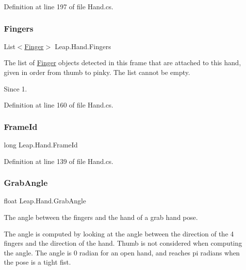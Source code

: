 Definition at line 197 of file Hand.\+cs.

\mbox{\label{class_leap_1_1_hand_ac9f68349507bfa13e3ac24738382bea6}} 
\subsubsection{\texorpdfstring{Fingers}{Fingers}}
{\footnotesize\ttfamily List$<$\mbox{\hyperlink{class_leap_1_1_finger}{Finger}}$>$ Leap.\+Hand.\+Fingers}



The list of \mbox{\hyperlink{class_leap_1_1_finger}{Finger}} objects detected in this frame that are attached to this hand, given in order from thumb to pinky. The list cannot be empty. 

\begin{DoxySince}{Since}
1. 
\end{DoxySince}


Definition at line 160 of file Hand.\+cs.

\mbox{\label{class_leap_1_1_hand_a37401850c4786b6c7c812db7bdd201ce}} 
\subsubsection{\texorpdfstring{FrameId}{FrameId}}
{\footnotesize\ttfamily long Leap.\+Hand.\+Frame\+Id}



Definition at line 139 of file Hand.\+cs.

\mbox{\label{class_leap_1_1_hand_ae459b2a6a13e6a28c9399f613849b502}} 
\subsubsection{\texorpdfstring{GrabAngle}{GrabAngle}}
{\footnotesize\ttfamily float Leap.\+Hand.\+Grab\+Angle}



The angle between the fingers and the hand of a grab hand pose. 

The angle is computed by looking at the angle between the direction of the 4 fingers and the direction of the hand. Thumb is not considered when computing the angle. The angle is 0 radian for an open hand, and reaches pi radians when the pose is a tight fist.

